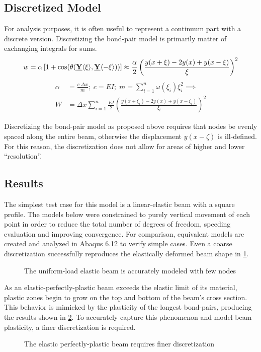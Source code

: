 \documentclass[11pt]{amsart}
\newcommand{\plotpath}{./plots}
\newcommand\vstate[3]{%
	\mathbf{\underline{#1}}%
	\ifstrempty{#2}{}{[#2]}%
	\ifstrempty{#3}{}{\langle #3 \rangle}}
\begin{document}
\subsection{Discretized Model}
For analysis purposes, it is often useful to represent a continuum part with a discrete version. 
Discretizing the bond-pair model is primarily matter of exchanging integrals for sums. 
%
\begin{align}
\label{eq:discreteBeamw}
w = \alpha \left[1+\cos(\theta(\vstate{Y}{}{\xi},\vstate{Y}{}{\mathbf{-\xi}})) \right] \approx \frac{\alpha}{2}\left(\frac{y(x+\xi)-2y(x)+y(x-\xi)}{\xi}\right)^2
\end{align}
%
\begin{align}
\label{eq:discretebeam}
\alpha &= \frac{c\; \Delta x}{m} ;\; c= EI ;\; m=\sum_{i=1}^n \omega(\xi_i)\xi_i^2 \implies \nonumber \\
W&=\Delta x \sum_{i=1}^n \frac{EI}{2}\left(\frac{y(x+\xi_i)-2y(x)+y(x-\xi_i)}{\xi_i}\right)^2
\end{align}
%

Discretizing the bond-pair model as proposed above requires that nodes be evenly spaced along the entire beam, otherwise the displacement \(y(x-\zeta)\) is ill-defined. 
For this reason, the discretization does not allow for areas of higher and lower ``resolution''. 
\subsection{Results}
The simplest test case for this model is a linear-elastic beam with a square profile.
The models below were constrained to purely vertical movement of each point in order to reduce the total number of degrees of freedom, speeding evaluation and improving convergence.
For comparison, equivalent models are created and analyzed in Abaqus 6.12 to verify simple cases.
Even a coarse discretization successfully reproduces the elastically deformed beam shape in \cref{fig:eppt_g100}.

\begin{figure}[h]
  \centering
  \scalebox{.55}{}
  \caption{The uniform-load elastic beam is accurately modeled with few nodes}
  \label{fig:eppt_g100}
\end{figure}

As an elastic-perfectly-plastic beam exceeds the elastic limit of its material, plastic zones begin to grow on the top and bottom of the beam's cross section.
This behavior is mimicked by the plasticity of the longest bond-pairs, producing the results shown in \cref{fig:eppu_h10_g2000}.
To accurately capture this phenomenon and model beam plasticity, a finer discretization is required.
\begin{figure}[h]
  \centering
  \scalebox{.55}{}
  \caption{The elastic perfectly-plastic beam requires finer discretization}
  \label{fig:eppu_h10_g2000}
\end{figure}
\end{document}
